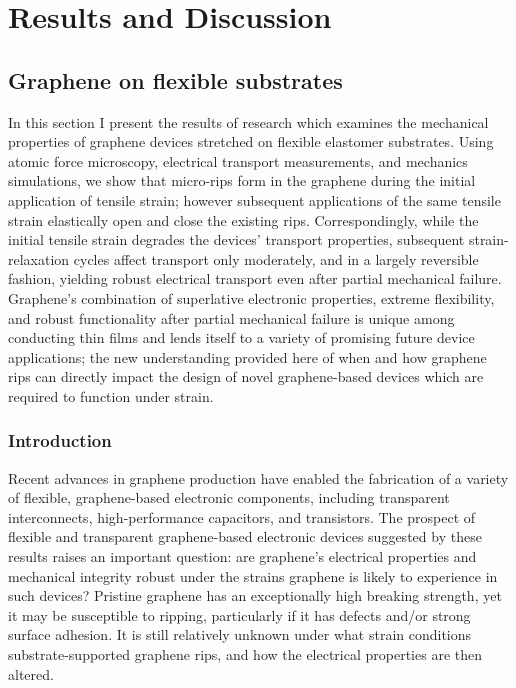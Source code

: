 \documentclass[edeposit,fullpage,draftthesis]{uiucthesis2009}
\begin{document}
\chapter{Results and Discussion}

\section{Graphene on flexible substrates}

    In this section I present the results of research which examines
    the mechanical properties of graphene devices stretched on flexible
    elastomer substrates. Using atomic force microscopy, electrical transport
    measurements, and mechanics simulations, we show that micro-rips form in the
    graphene during the initial application of tensile strain; however subsequent
    applications of the same tensile strain elastically open and close the existing
    rips. Correspondingly, while the initial tensile strain degrades the devices'
    transport properties, subsequent strain-relaxation cycles affect transport only
    moderately, and in a largely reversible fashion, yielding robust electrical
    transport even after partial mechanical failure. Graphene's combination of
    superlative electronic properties, extreme flexibility, and robust
    functionality after partial mechanical failure is unique among conducting thin
    films and lends itself to a variety of promising future device applications;
    the new understanding provided here of when and how graphene rips can directly
    impact the design of novel graphene-based devices which are required to
    function under strain.
    
    \subsection{Introduction}
    
        Recent advances in graphene production\cite{Kim2009, Bae2010, Lee2010} have
        enabled the fabrication of a variety of flexible, graphene-based electronic
        components, including transparent interconnects\cite{Kim2011}, high-performance
        capacitors\cite{El-Kady2012}, and transistors\cite{Lee2011}. The prospect of
        flexible and transparent graphene-based electronic devices suggested by these
        results raises an important question: are graphene's electrical properties and
        mechanical integrity robust under the strains graphene is likely to experience
        in such devices? Pristine graphene has an exceptionally high breaking
        strength\cite{Lee2008}, yet it may be susceptible to ripping, particularly if
        it has defects \cite{Kim2012} and/or strong  surface adhesion\cite{Sen2010}. It
        is still relatively unknown under what strain conditions substrate-supported
        graphene rips, and how the electrical properties are then altered.
        
\end{document}
